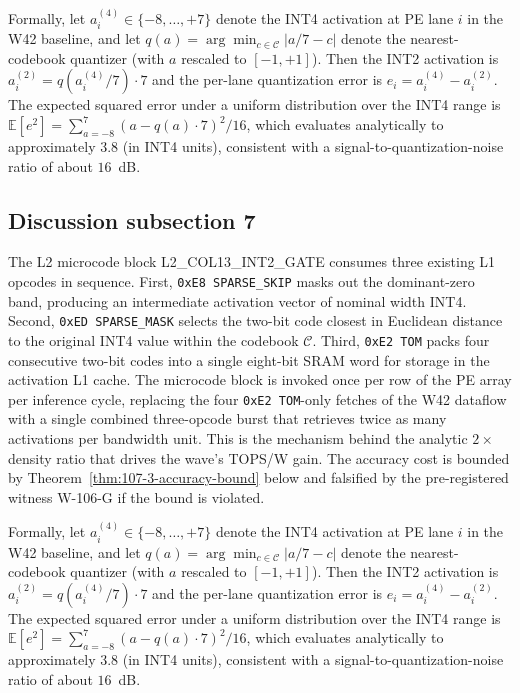 Formally, let $a_{i}^{(4)} \in \{-8,\ldots,+7\}$ denote the INT4
activation at PE lane $i$ in the W42 baseline, and let
$q(a) = \arg\min_{c \in \mathcal{C}} |a/7 - c|$ denote the
nearest-codebook quantizer (with $a$ rescaled to $[-1,+1]$). Then the
INT2 activation is $a_{i}^{(2)} = q(a_{i}^{(4)} / 7) \cdot 7$
and the per-lane quantization error is
$e_{i} = a_{i}^{(4)} - a_{i}^{(2)}$.
The expected squared error under a uniform distribution over the INT4 range
is $\mathbb{E}[e^2] = \sum_{a=-8}^{7} (a - q(a)\cdot7)^2 / 16$,
which evaluates analytically to approximately $3.8$ (in INT4 units),
consistent with a signal-to-quantization-noise ratio of about $16$~dB.


\subsection{Discussion subsection 7}

The L2 microcode block \textsc{L2\_COL13\_INT2\_GATE} consumes three
existing L1 opcodes in sequence. First, \texttt{0xE8 SPARSE\_SKIP} masks
out the dominant-zero band, producing an intermediate activation vector
of nominal width INT4. Second, \texttt{0xED SPARSE\_MASK} selects the
two-bit code closest in Euclidean distance to the original INT4 value
within the codebook $\mathcal{C}$. Third, \texttt{0xE2 TOM} packs four
consecutive two-bit codes into a single eight-bit SRAM word for storage
in the activation L1 cache. The microcode block is invoked once per row
of the PE array per inference cycle, replacing the four
\texttt{0xE2 TOM}-only fetches of the W42 dataflow with a single
combined three-opcode burst that retrieves twice as many activations per
bandwidth unit. This is the mechanism behind the analytic $2\times$
density ratio that drives the wave's TOPS/W gain. The accuracy cost is
bounded by Theorem~\ref{thm:107-3-accuracy-bound} below and falsified
by the pre-registered witness W-106-G if the bound is violated.

Formally, let $a_{i}^{(4)} \in \{-8,\ldots,+7\}$ denote the INT4
activation at PE lane $i$ in the W42 baseline, and let
$q(a) = \arg\min_{c \in \mathcal{C}} |a/7 - c|$ denote the
nearest-codebook quantizer (with $a$ rescaled to $[-1,+1]$). Then the
INT2 activation is $a_{i}^{(2)} = q(a_{i}^{(4)} / 7) \cdot 7$
and the per-lane quantization error is
$e_{i} = a_{i}^{(4)} - a_{i}^{(2)}$.
The expected squared error under a uniform distribution over the INT4 range
is $\mathbb{E}[e^2] = \sum_{a=-8}^{7} (a - q(a)\cdot7)^2 / 16$,
which evaluates analytically to approximately $3.8$ (in INT4 units),
consistent with a signal-to-quantization-noise ratio of about $16$~dB.


